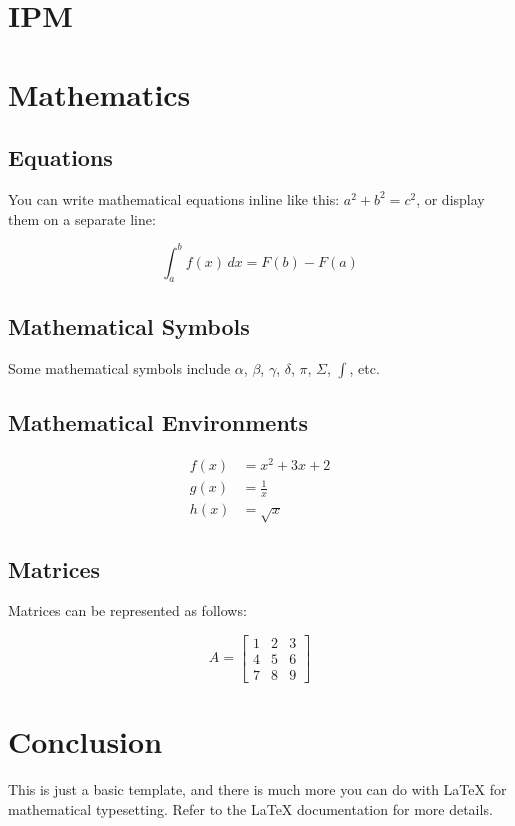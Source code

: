 \documentclass{article}
\begin{document}
\section{IPM}

\section{Mathematics}

\subsection{Equations}

You can write mathematical equations inline like this: $a^2 + b^2 = c^2$, or display them on a separate line:

\begin{equation}
  \int_{a}^{b} f(x) \,dx = F(b) - F(a)
\end{equation}

\subsection{Mathematical Symbols}

Some mathematical symbols include $\alpha$, $\beta$, $\gamma$, $\delta$, $\pi$, $\Sigma$, $\int$, etc.

\subsection{Mathematical Environments}

\begin{align}
  f(x) &= x^2 + 3x + 2 \\
  g(x) &= \frac{1}{x} \\
  h(x) &= \sqrt{x}
\end{align}

\subsection{Matrices}

Matrices can be represented as follows:

\[
A = \begin{bmatrix}
  1 & 2 & 3 \\
  4 & 5 & 6 \\
  7 & 8 & 9
\end{bmatrix}
\]

\section{Conclusion}

This is just a basic template, and there is much more you can do with LaTeX for mathematical typesetting. Refer to the LaTeX documentation for more details.

\end{document}
